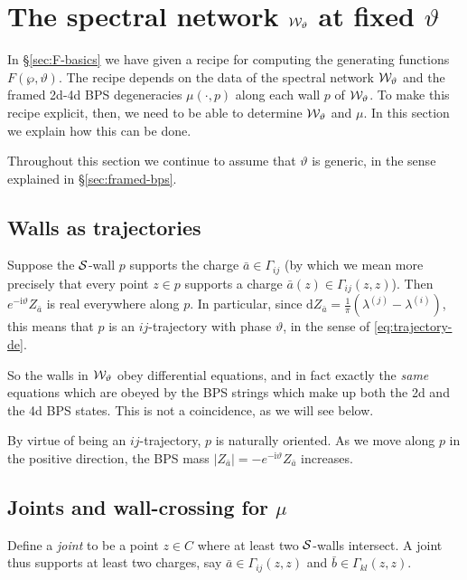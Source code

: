 \documentclass[11pt,a4paper]{article}
\def\wnet {{\cal W}}
\def\cS {{\cal S}}
\newcommand{\abs}[1]{\lvert#1\rvert}
\newcommand{\ti}[1]{\textit{#1}}
\def\wnet {{\cal W}}
\newcommand\I{{\mathrm i}}
\newcommand\de{{\mathrm{d}}}
\begin{document}
\section{The spectral network $\wnet_\vartheta$ at fixed $\vartheta$} \label{sec:wnet}

In \S\ref{sec:F-basics}
we have given a recipe for computing the generating functions $F(\wp, \vartheta)$.
The recipe depends on the data of the spectral network $\wnet_\vartheta$ and the framed
2d-4d BPS degeneracies $\mu(\cdot, p)$ along each wall $p$ of $\wnet_\vartheta$.
To make this recipe explicit, then, we need to be able to determine
$\wnet_\vartheta$ and $\mu$.  In this section we explain how this can be done.

Throughout this section we continue to assume that $\vartheta$ is generic,
in the sense explained in \S\ref{sec:framed-bps}.


\subsection{Walls as trajectories}

Suppose the $\cS$-wall $p$
supports the charge $\bar a \in \Gamma_{ij}$ (by which we mean more precisely that
every point $z \in p$ supports a charge $\bar a(z) \in \Gamma_{ij}(z,z)$).
Then $e^{- \I \vartheta} Z_{\bar a}$ is real everywhere along $p$.
In particular, since $\de Z_{\bar a} = \frac{1}{\pi}(\lambda^{(j)} - \lambda^{(i)})$,
this means that $p$ is an $ij$-trajectory with phase $\vartheta$, in the sense of
\eqref{eq:trajectory-de}.

So the walls in $\wnet_\vartheta$ obey differential equations, and in fact
exactly the \ti{same} equations which are obeyed
by the BPS strings which make up both the 2d and the 4d BPS states.
This is not a coincidence, as we will see below.

By virtue of being an $ij$-trajectory, $p$ is naturally oriented.
As we move along $p$ in the positive direction, the BPS mass $\abs{Z_{\bar a}} = - e^{- \I \vartheta} Z_{\bar a}$ increases.



\subsection{Joints and wall-crossing for $\mu$} \label{sec:wnet-basics}

Define a \ti{joint} to be a point $z \in C$ where at least two $\cS$-walls intersect.
A joint thus supports at least two charges, say $\bar a \in \Gamma_{ij}(z,z)$ and $\bar b \in \Gamma_{kl}(z,z)$.
\end{document}
